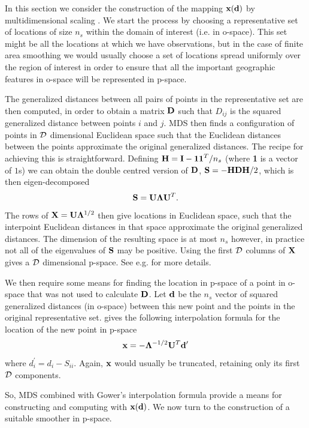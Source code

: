 \documentclass[smallextended]{svjour3}       %
\newcommand{\ts}{^T}
\begin{document}
In this section we consider the construction of the mapping ${\bf x}({\bf d})$ by multidimensional scaling \citep[MDS;][]{Gower:1968to}. We start the process by choosing a representative set of locations of size $n_s$ within the domain of interest (i.e. in o-space). This set might be all the locations at which we have observations, but in the case of finite area smoothing we would usually choose a set of locations spread uniformly over the region of interest in order to ensure that all the important geographic features in o-space will be represented in p-space. 

The generalized distances between all pairs of points in the representative set are then computed, in order to obtain a matrix $\bf D$ such that $D_{ij}$ is the squared generalized distance between points $i$ and $j$. MDS then finds a configuration of points in $\cal D$ dimensional Euclidean space such that the Euclidean distances between the points approximate the original generalized distances. The recipe for achieving this is straightforward. Defining ${\bf H} = {\bf I} - {\bf 11}\ts/n_s$ (where {\bf 1} is a vector of $1$s) we can obtain the double centred version of ${\bf D}$, ${\bf S} = - {\bf HDH}/2$, which is then eigen-decomposed
$$
{\bf S} = {\bf U}{\bm \Lambda}{\bf U}\ts.
$$ 
The rows of  ${\bf X }= {\bf U}{\bm \Lambda}^{1/2}$ then give locations in Euclidean space, such that the interpoint Euclidean distances in that space approximate the original generalized distances. The dimension of the resulting space is at most $n_s$ however, in practice not all of the eigenvalues of ${\bf S}$ may be positive. Using the first $\cal D$ columns of $\bf X$ gives a $\cal D$ dimensional p-space. See e.g. \cite[Chapter 10]{chatfield1980introduction} for more details.

We then require some means for finding the location in p-space of a point in o-space that was not used to calculate $\bf D$. Let $\bf d$ be the $n_s$ vector of squared generalized distances (in o-space) between this new point and the points in the original representative set. \cite{Gower:1968to} gives the following interpolation formula for the location of the new point in p-space 
$$
{\bf x} = - {\bm \Lambda}^{-1/2} {\bf U}\ts {\bf d}^\prime
$$
where $d^\prime_i = d_i - S_{ii}$. Again, $\bf x$ would usually be truncated, retaining only its first $\cal D $ components. 

So, MDS combined with Gower's interpolation formula provide a means for constructing and computing with ${\bf x}({\bf d})$. We now turn to the construction of a suitable smoother in p-space.
\end{document}
